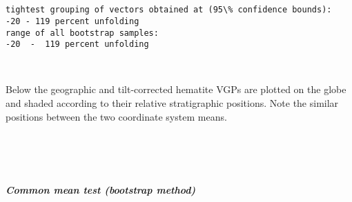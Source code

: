 \documentclass[11pt]{article}
\begin{document}
    \begin{center}
    \end{center}
    { \hspace*{\fill} \\}
    
    \begin{center}
    \end{center}
    { \hspace*{\fill} \\}
    
    \begin{Verbatim}[commandchars=\\\{\}]
tightest grouping of vectors obtained at (95\% confidence bounds):
-20 - 119 percent unfolding
range of all bootstrap samples: 
-20  -  119 percent unfolding

    \end{Verbatim}

    \begin{center}
    \end{center}
    { \hspace*{\fill} \\}
    
    Below the geographic and tilt-corrected hematite VGPs are plotted on the
globe and shaded according to their relative stratigraphic positions.
Note the similar positions between the two coordinate system means.


    \begin{center}
    \end{center}
    { \hspace*{\fill} \\}
    

    \begin{center}
    \end{center}
    { \hspace*{\fill} \\}
    
    \subparagraph{Common mean test (bootstrap
method)}\label{common-mean-test-bootstrap-method}
\end{document}
